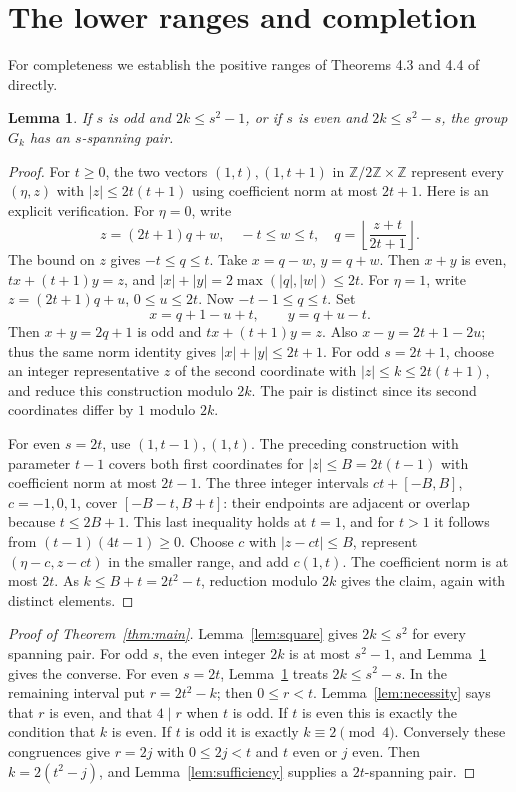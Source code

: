 \documentclass[11pt]{article}
\newtheorem{lemma}[theorem]{Lemma}
\newcommand{\Z}{\mathbb Z}
\newcommand{\Gk}{G_k}
\begin{document}
\section{The lower ranges and completion}
For completeness we establish the positive ranges of Theorems 4.3 and
4.4 of \cite{BB} directly.

\begin{lemma}\label{lem:lower}
If $s$ is odd and $2k\le s^2-1$, or if $s$ is even and
$2k\le s^2-s$, the group $\Gk$ has an $s$-spanning pair.
\end{lemma}
\begin{proof}
For $t\ge0$, the two vectors $(1,t),(1,t+1)$ in $\Z/2\Z\times\Z$
represent every $(\eta,z)$ with $|z|\le2t(t+1)$ using coefficient
norm at most $2t+1$. Here is an explicit verification.
For $\eta=0$, write
\[
z=(2t+1)q+w,\quad -t\le w\le t,\quad
q=\left\lfloor\frac{z+t}{2t+1}\right\rfloor.
\]
The bound on $z$ gives $-t\le q\le t$.
Take $x=q-w$, $y=q+w$. Then $x+y$ is even,
$tx+(t+1)y=z$, and $|x|+|y|=2\max(|q|,|w|)\le2t$.
For $\eta=1$, write $z=(2t+1)q+u$, $0\le u\le2t$.
Now $-t-1\le q\le t$. Set
\[
x=q+1-u+t,\qquad y=q+u-t.
\]
Then $x+y=2q+1$ is odd and $tx+(t+1)y=z$.
Also $x-y=2t+1-2u$; thus the same norm identity gives
$|x|+|y|\le2t+1$.
For odd $s=2t+1$, choose an integer representative $z$ of the second
coordinate with $|z|\le k\le2t(t+1)$, and reduce this construction
modulo $2k$. The pair is distinct since its second coordinates differ
by $1$ modulo $2k$.

For even $s=2t$, use $(1,t-1),(1,t)$. The preceding construction
with parameter $t-1$ covers both first coordinates for
$|z|\le B=2t(t-1)$ with coefficient norm at most $2t-1$.
The three integer intervals $ct+[-B,B]$, $c=-1,0,1$, cover
$[-B-t,B+t]$: their endpoints are adjacent or overlap because
$t\le2B+1$. This last inequality holds at $t=1$, and for $t>1$ it
follows from $(t-1)(4t-1)\ge0$.
Choose $c$ with $|z-ct|\le B$, represent $(\eta-c,z-ct)$ in the
smaller range, and add $c(1,t)$. The coefficient norm is at most
$2t$. As $k\le B+t=2t^2-t$, reduction modulo $2k$ gives the claim,
again with distinct elements.
\end{proof}

\begin{proof}[Proof of Theorem~\ref{thm:main}]
Lemma~\ref{lem:square} gives $2k\le s^2$ for every spanning pair.
For odd $s$, the even integer $2k$ is at most $s^2-1$, and
Lemma~\ref{lem:lower} gives the converse.
For even $s=2t$, Lemma~\ref{lem:lower} treats $2k\le s^2-s$.
In the remaining interval put $r=2t^2-k$; then $0\le r<t$.
Lemma~\ref{lem:necessity} says that $r$ is even, and that
$4\mid r$ when $t$ is odd. If $t$ is even this is exactly the
condition that $k$ is even. If $t$ is odd it is exactly
$k\equiv2\pmod4$.
Conversely these congruences give $r=2j$ with $0\le2j<t$ and
$t$ even or $j$ even. Then $k=2(t^2-j)$, and
Lemma~\ref{lem:sufficiency} supplies a $2t$-spanning pair.
\end{proof}
\end{document}
